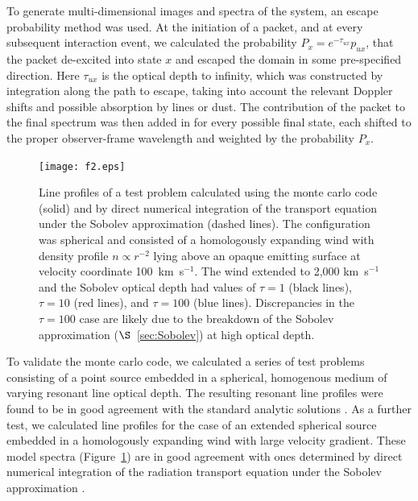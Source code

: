 \documentclass[]{emulateapj}
\begin{document}
To generate multi-dimensional images and spectra of the system, an escape probability method was used.  At the initiation of a packet, and at every subsequent interaction event, we calculated the probability $P_x = e^{-\tau_{ux}} p_{ux}$,  that the packet de-excited into state $x$ and escaped the domain in some pre-specified direction. Here
$\tau_{ux}$ is the optical depth to infinity, which was  constructed
by integration along the path to escape, taking into account the
relevant Doppler shifts and possible absorption by lines or dust.  The
contribution of the packet to the final spectrum was then added in for
every possible final state, each shifted to the proper observer-frame
wavelength and weighted by the probability $P_x$. 

\begin{figure}
\texttt{[image: f2.eps]}
\caption{
Line profiles of a test problem calculated using the monte carlo code (solid) and by direct numerical integration of the transport equation under the Sobolev approximation (dashed lines).  The configuration was  spherical and consisted of a homologously expanding wind  with density profile $n \propto r^{-2}$  lying above an opaque emitting surface at velocity coordinate 100~km~s$^{-1}$.  
The wind extended to 2,000 km~s$^{-1}$ and the Sobolev optical depth
had values of  $\tau = 1$ (black lines), $\tau = 10$ (red lines), and
$\tau = 100$ (blue lines).    Discrepancies in the $\tau = 100$ case
are likely due to the breakdown of the Sobolev approximation
($\S$~\ref{sec:Sobolev}) at high optical depth. 
}
\label{fig:oneline_test}
\end{figure}



To validate the monte carlo code, we calculated a series of test
problems consisting of a point source embedded in a spherical,
homogenous medium of varying resonant line optical depth.  The
resulting resonant line profiles  \citep[see][]{Kasen_lyman} were 
found to be in good agreement with the standard analytic solutions
\citep{Harrington_1973,Neufeld_1990,Dijkstra_2006}.  As a further
test, we calculated line profiles for the case of an extended
spherical source embedded in a homologously expanding wind with large
velocity gradient.  These model spectra
(Figure~\ref{fig:oneline_test}) are in good agreement with ones
determined by direct numerical integration of the radiation transport
equation under the Sobolev approximation
\citep[$\S$~\ref{sec:Sobolev}; e.g.,][]{Jeffery_Branch}.
\end{document}
